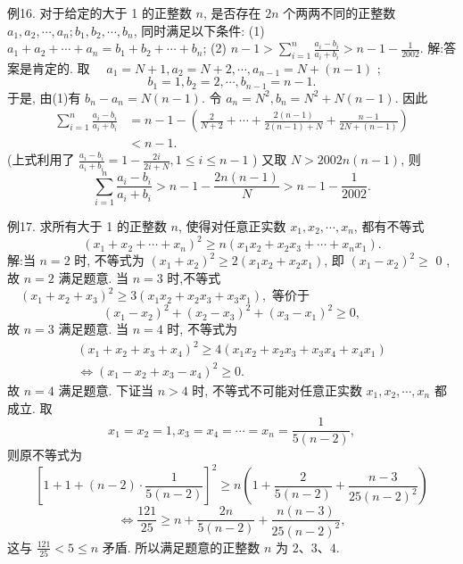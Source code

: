例16. 对于给定的大于 1 的正整数 $n$, 是否存在 $2 n$ 个两两不同的正整数 $a_1, a_2, \cdots, a_n ; b_1, b_2, \cdots, b_n$, 同时满足以下条件:
(1) $a_1+a_2+\cdots+a_n=b_1+b_2+\cdots+b_n$;
(2) $n-1>\sum_{i=1}^n \frac{a_i-b_i}{a_i+b_i}>n-1-\frac{1}{2002}$.
解:答案是肯定的.
取 $\quad a_1=N+1, a_2=N+2, \cdots, a_{n-1}=N+(n-1)$ ;
$$
b_1=1, b_2=2, \cdots, b_{n-1}=n-1 .
$$
于是, 由(1)有 $b_n-a_n=N(n-1)$. 令 $a_n=N^2, b_n=N^2+N(n-1)$.
因此
$$
\begin{aligned}
\sum_{i=1}^n \frac{a_i-b_i}{a_i+b_i} & =n-1-\left(\frac{2}{N+2}+\cdots+\frac{2(n-1)}{2(n-1)+N}+\frac{n-1}{2 N+(n-1)}\right) \\
& <n-1 .
\end{aligned}
$$
(上式利用了 $\frac{a_i-b_i}{a_i+b_i}=1-\frac{2 i}{2 i+N}, 1 \leqslant i \leqslant n-1$ )
又取 $N>2002 n(n-1)$, 则
$$
\sum_{i=1}^n \frac{a_i-b_i}{a_i+b_i}>n-1-\frac{2 n(n-1)}{N}>n-1-\frac{1}{2002} .
$$



例17. 求所有大于 1 的正整数 $n$, 使得对任意正实数 $x_1, x_2, \cdots, x_n$, 都有不等式
$$
\left(x_1+x_2+\cdots+x_n\right)^2 \geqslant n\left(x_1 x_2+x_2 x_3+\cdots+x_n x_1\right) .
$$
解:当 $n=2$ 时, 不等式为 $\left(x_1+x_2\right)^2 \geqslant 2\left(x_1 x_2+x_2 x_1\right)$, 即 $\left(x_1-x_2\right)^2 \geqslant$ 0 , 故 $n=2$ 满足题意.
当 $n=3$ 时,不等式 $\quad\left(x_1+x_2+x_3\right)^2 \geqslant 3\left(x_1 x_2+x_2 x_3+x_3 x_1\right) ,$
等价于
$$
\left(x_1-x_2\right)^2+\left(x_2-x_3\right)^2+\left(x_3-x_1\right)^2 \geqslant 0,
$$
故 $n=3$ 满足题意.
当 $n=4$ 时, 不等式为
$$
\begin{gathered}
\left(x_1+x_2+x_3+x_4\right)^2 \geqslant 4\left(x_1 x_2+x_2 x_3+x_3 x_4+x_4 x_1\right) \\
\Leftrightarrow\left(x_1-x_2+x_3-x_4\right)^2 \geqslant 0 .
\end{gathered}
$$
故 $n=4$ 满足题意.
下证当 $n>4$ 时, 不等式不可能对任意正实数 $x_1, x_2, \cdots, x_n$ 都成立.
取
$$
x_1=x_2=1, x_3=x_4=\cdots=x_n=\frac{1}{5(n-2)},
$$
则原不等式为
$$
\left[1+1+(n-2) \cdot \frac{1}{5(n-2)}\right]^2 \geqslant n\left(1+\frac{2}{5(n-2)}+\frac{n-3}{25(n-2)^2}\right)
$$
$$
\Leftrightarrow \frac{121}{25} \geqslant n+\frac{2 n}{5(n-2)}+\frac{n(n-3)}{25(n-2)^2},
$$
这与 $\frac{121}{25}<5 \leqslant n$ 矛盾.
所以满足题意的正整数 $n$ 为 $2 、 3 、 4$.



